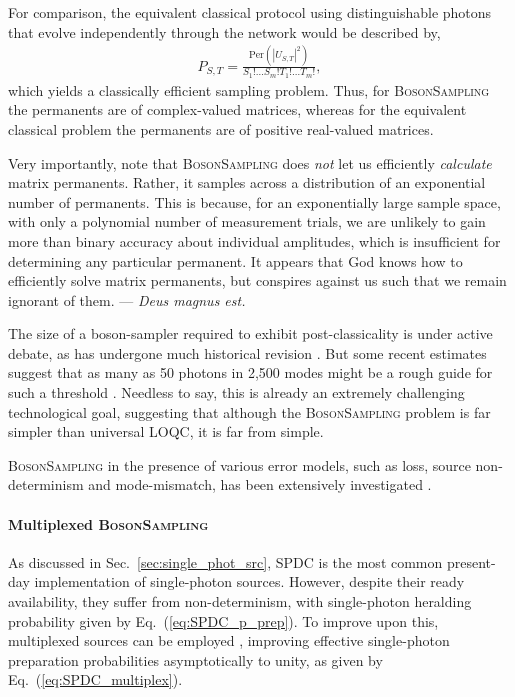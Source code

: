 For comparison, the equivalent classical protocol using distinguishable photons that evolve independently through the network would be described by,
\begin{align}
	P_{S,T} = \frac{\text{Per}(|U_{S,T}|^2)}{S_1!\dots S_m! T_1!\dots T_m!},
\end{align}
which yields a classically efficient sampling problem. Thus, for \textsc{BosonSampling} the permanents are of complex-valued matrices, whereas for the equivalent classical problem the permanents are of positive real-valued matrices.

Very importantly, note that \textsc{BosonSampling} does \textit{not} let us efficiently \textit{calculate} matrix permanents. Rather, it samples across a distribution of an exponential number of permanents. This is because, for an exponentially large sample space, with only a polynomial number of measurement trials, we are unlikely to gain more than binary accuracy about individual amplitudes, which is insufficient for determining any particular permanent. It appears that God knows how to efficiently solve matrix permanents, but conspires against us such that we remain ignorant of them. --- \textit{Deus magnus est.}

The size of a boson-sampler required to exhibit post-classicality is under active debate, as has undergone much historical revision \cite{RohdeRalph}. But some recent estimates suggest that as many as 50 photons in 2,500 modes might be a rough guide for such a threshold \cite{NoSupBS_Montanaro}. Needless to say, this is already an extremely challenging technological goal, suggesting that although the \textsc{BosonSampling} problem is far simpler than universal LOQC, it is far from simple.

\textsc{BosonSampling} in the presence of various error models, such as loss, source non-determinism and mode-mismatch, has been extensively investigated \cite{bib:RohdeErrBS12, bib:RohdeSPDC13, bib:ScottLost16, bib:RohdeArbSpec15, bib:RandBS}. 

%
%

\paragraph{Multiplexed \textsc{BosonSampling}} 

As discussed in Sec.~\ref{sec:single_phot_src}, SPDC is the most common present-day implementation of single-photon sources. However, despite their ready availability, they suffer from non-determinism, with single-photon heralding probability given by Eq.~(\ref{eq:SPDC_p_prep}). To improve upon this, multiplexed sources can be employed \cite{bib:RohdeSPDC13}, improving effective single-photon preparation probabilities asymptotically to unity, as given by Eq.~(\ref{eq:SPDC_multiplex}).

